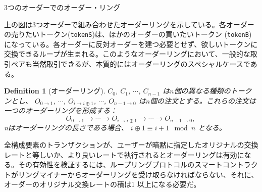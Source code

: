 \documentclass{article}
\makeatletter
\newtheorem{definition}{Definition}[section]
\newenvironment{figurehere}
 {\def\@captype{figure}}
 {}
\makeatother
\begin{document}
\begin{multicols}{2}
\begin{center}
\begin{figurehere}

\caption{3つのオーダーでのオーダー・リング}
\label{fig:ring}
\end{figurehere}
\end{center}

上の図は3つオーダーで組み合わせたオーダーリングを示している。各オーダーの売りたいトークン(\verb|tokenS|)は、ほかのオーダーの買いたいトークン (\verb|tokenB|)になっている。各オーダーに反対オーダーを建つ必要とせず、欲しいトークンに交換できるループが生まれる。このようなオーダーリングにおいて、一般的な取引ペアも当然取引できるが、本質的にはオーダーリングのスペシャルケースである。


\begin{definition}[オーダーリング]$C_{0}$, $C_{1}$, $\cdots$, $C_{n-1}$ は$n$個の異なる種類のトークンとし、 $O_{0\rightarrow 1}$, $\cdots$, $O_{i\rightarrow i\oplus 1}$, $\cdots$, $O_{n-1 \rightarrow 0}$ は$n$個の注文とする。これらの注文は一つのオーダーリングを形成する：
$$O_{0\rightarrow 1} \rightarrow \cdots \rightarrow O_{i\rightarrow i\oplus 1} \rightarrow \cdots \rightarrow O_{n-1\rightarrow 0} \text{, }$$
nはオーダーリングの長さである場合、 $i\oplus 1 \equiv i+1 \mod n$ となる。
\end{definition}

全構成要素のトランザクションが、ユーザーが暗黙に指定したオリジナルの交換レートと等しいか、より良いレートで執行されるとオーダーリングは有効になる。その有効性を検証するには、ループリングプロトコルのスマートコントラクトがリングマイナーからオーダーリングを受け取らなければならない、それに、オーダーのオリジナル交換レートの積は1 以上になる必要だ。


\end{multicols}
\end{document}
